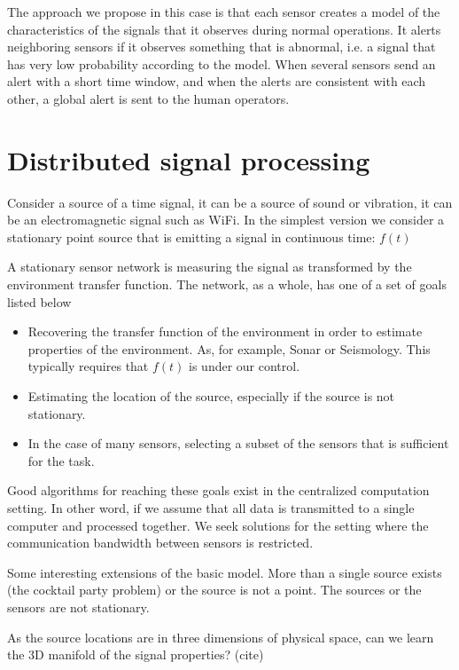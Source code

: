 \documentclass{article}
\begin{document}
 The approach we propose in this case is that each sensor creates a
 model of the characteristics of the signals that it observes during
 normal operations. It alerts neighboring sensors if it observes
 something that is abnormal, i.e. a signal that has very low
 probability according to the model. When several sensors send an
 alert with a short time window, and when the alerts are consistent
 with each other, a global alert is sent to the human operators.

\section{Distributed signal processing}

Consider a source of a time signal, it can be a source of sound or vibration, it can be an electromagnetic signal such as WiFi. In the simplest version we consider a stationary point source that is emitting a signal in continuous time: $f(t)$

A stationary sensor network is measuring the signal as transformed by the environment transfer function. The network, as a whole, has one of a set of goals listed below

\begin{itemize}
    \item Recovering the transfer function of the environment in order to estimate properties of the environment. As, for example, Sonar or Seismology. This typically requires that $f(t)$ is under our control.
    \item Estimating the location of the source, especially if the source is not stationary.
    \item In the case of many sensors, selecting a subset of the sensors that is sufficient for the task.
\end{itemize}

Good algorithms for reaching these goals exist in the centralized computation setting. In other word, if we assume that all data is  transmitted to a single computer and processed together. We seek solutions for the setting where the communication bandwidth between sensors is restricted.

Some interesting extensions of the basic model. More than a single source exists (the cocktail party problem) or the source is not a point. The sources or the sensors are not stationary. 

As the source locations are in three dimensions of physical space, can we learn the 3D manifold of the signal properties? (cite)
\end{document}
